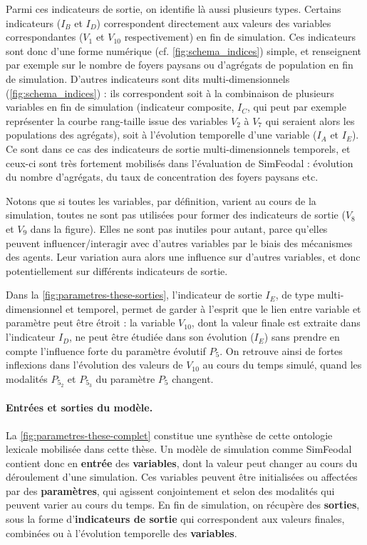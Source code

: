 Parmi ces indicateurs de sortie, on identifie là aussi plusieurs types.
Certains indicateurs ($I_B$ et $I_D$) correspondent directement aux valeurs des variables correspondantes ($V_1$ et $V_{10}$ respectivement) en fin de simulation.
Ces indicateurs sont donc d'une forme numérique (cf. \cref{fig:schema_indices}) simple, et renseignent par exemple sur le nombre de foyers paysans ou d'agrégats de population en fin de simulation.
D'autres indicateurs sont dits \og multi-dimensionnels\fg{} (\cref{fig:schema_indices}) : ils correspondent soit à la combinaison de plusieurs variables en fin de simulation (indicateur \og composite\fg{}, $I_C$, qui peut par exemple représenter la courbe rang-taille issue des variables $V_2$ à $V_7$ qui seraient alors les populations des agrégats), soit à l'évolution temporelle d'une variable ($I_A$ et $I_E$).
Ce sont dans ce cas des indicateurs de sortie multi-dimensionnels temporels, et ceux-ci sont très fortement mobilisés dans l'évaluation de SimFeodal : évolution du nombre d'agrégats, du taux de concentration des foyers paysans etc.

Notons que si toutes les variables, par définition, varient au cours de la simulation, toutes ne sont pas utilisées pour former des indicateurs de sortie ($V_8$ et $V_9$ dans la figure).
Elles ne sont pas \og inutiles\fg{} pour autant, parce qu'elles peuvent influencer/interagir avec d'autres variables par le biais des mécanismes des agents.
Leur variation aura alors une influence sur d'autres variables, et donc potentiellement sur différents indicateurs de sortie.

Dans la \cref{fig:parametres-these-sorties}, l'indicateur de sortie $I_E$, de type multi-dimensionnel et temporel, permet de garder à l'esprit que le lien entre variable et paramètre peut être étroit : la variable $V_{10}$, dont la valeur finale est extraite dans l'indicateur $I_D$, ne peut être étudiée dans son évolution ($I_E$) sans prendre en compte l'influence forte du paramètre évolutif $P_5$.
On retrouve ainsi de fortes inflexions dans l'évolution des valeurs de $V_{10}$ au cours du temps simulé, quand les modalités $P_{5_2}$ et $P_{5_3}$ du paramètre $P_5$ changent.


\paragraph{Entrées et sorties du modèle.}

La \cref{fig:parametres-these-complet} constitue une synthèse de cette \og ontologie\fg{} lexicale mobilisée dans cette thèse.
Un modèle de simulation comme SimFeodal contient donc en \textbf{entrée} des \textbf{variables}, dont la valeur peut changer au cours du déroulement d'une simulation.
Ces variables peuvent être initialisées ou affectées par des \textbf{paramètres}, qui agissent conjointement et selon des modalités qui peuvent varier au cours du temps.
En fin de simulation, on récupère des \textbf{sorties}, sous la forme d'\textbf{indicateurs de sortie} qui correspondent aux valeurs finales, combinées ou à l'évolution temporelle des \textbf{variables}.

